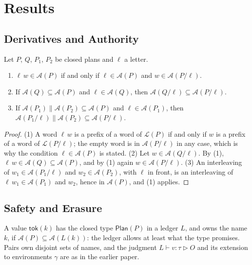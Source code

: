 \documentclass[acmsmall,nonacm,screen]{acmart}
\newcommand{\kw}[1]{\mathsf{#1}}
\newcommand{\Plan}[1]{\kw{Plan}(#1)}
\newcommand{\tok}[1]{\kw{tok}(#1)}
\newcommand{\auth}[1]{\mathcal{A}(#1)}
\newcommand{\lang}[1]{\mathcal{L}(#1)}
\newcommand{\sh}{\mathbin{\parallel}}
\newcommand{\own}{\mathrel{\triangleright}}
\begin{document}
\section{Results}
\label{sec:results}

\subsection{Derivatives and Authority}

\begin{lemma}[Derivatives]
\label{lem:derivatives}
Let $P$, $Q$, $P_1$, $P_2$ be closed plans and $\ell$ a letter.
\begin{enumerate}
\item $\ell\,w \in \auth{P}$ if and only if $\ell \in \auth{P}$ and $w \in \auth{P / \ell}$.
\item If $\auth{Q} \subseteq \auth{P}$ and $\ell \in \auth{Q}$, then
  $\auth{Q / \ell} \subseteq \auth{P / \ell}$.
\item If $\auth{P_1} \sh \auth{P_2} \subseteq \auth{P}$ and $\ell \in \auth{P_1}$, then
  $\auth{P_1 / \ell} \sh \auth{P_2} \subseteq \auth{P / \ell}$.
\end{enumerate}
\end{lemma}

\begin{proof}
(1) A word $\ell\,w$ is a prefix of a word of $\lang{P}$ if and only if $w$ is a prefix of a
word of $\lang{P / \ell}$; the empty word is in $\auth{P / \ell}$ in any case, which is why
the condition $\ell \in \auth{P}$ is stated. (2) Let $w \in \auth{Q / \ell}$. By (1),
$\ell\,w \in \auth{Q} \subseteq \auth{P}$, and by (1) again $w \in \auth{P / \ell}$. (3) An
interleaving of $w_1 \in \auth{P_1 / \ell}$ and $w_2 \in \auth{P_2}$, with $\ell$ in front,
is an interleaving of $\ell\,w_1 \in \auth{P_1}$ and $w_2$, hence in $\auth{P}$, and (1)
applies.
\end{proof}

\subsection{Safety and Erasure}

A value $\tok{k}$ has the closed type $\Plan{P}$ in a ledger $L$, and owns the name $k$, if
$\auth{P} \subseteq \auth{L(k)}$: the ledger allows at least what the type promises. Pairs
own disjoint sets of names, and the judgment $L \vdash v : \tau \own O$ and its extension to
environments $\gamma$ are as in the earlier paper.
\end{document}
